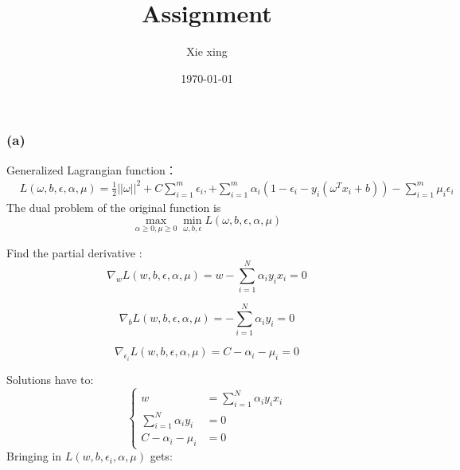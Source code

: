 \documentclass[oneside,solution]{seu-ml-assign}
\title{Assignment}
\author{Xie xing}
\date{\today}
\begin{document}
\maketitle


\subsection{}


\subsubsection{(a)}
Generalized Lagrangian function：
\begin{equation}\begin{aligned} & L(\omega,b,\epsilon,\alpha,\mu)=\frac12||\omega||^2+C\sum_{i=1}^m\epsilon_i,+\sum_{i=1}^m
               \alpha_i(1-\epsilon_i-y_i(\omega^Tx_i+b))-\sum_{i=1}^m\mu_i\epsilon_i\end{aligned}
\end{equation}
The dual problem of the original function is
\begin{equation}\max_{\alpha\geq0,\mu\geq0}\min_{\omega,b,\epsilon}L(\omega,b,\epsilon,\alpha,\mu)\end{equation}

Find the partial derivative :
\begin{equation}
  \nabla_{w}L(w,b,\epsilon,\alpha,\mu)=w-\sum_{i=1}^{N}\alpha_{i}y_{i}x_{i}=0 
\end{equation}

\begin{equation}
  \nabla_{b}L(w,b,\epsilon,\alpha,\mu)=-\sum_{i=1}^{N}\alpha_{i}y_{i}=0
\end{equation}

\begin{equation}
  \nabla_{\epsilon_{i}}L(w,b,\epsilon,\alpha,\mu)=C-\alpha_{i}-\mu_{i}=0
\end{equation}

Solutions have to:
\begin{equation}\left.\left\{\begin{aligned}w&=\sum_{i=1}^N\alpha_iy_ix_i\\
  \sum_{i=1}^N\alpha_iy_i&=0\\
  C-\alpha_i-\mu_i&=0\end{aligned}\right.\right.
\end{equation}
Bringing in $L(w,b,\epsilon_i,\alpha,\mu)$ gets:
\end{document}
